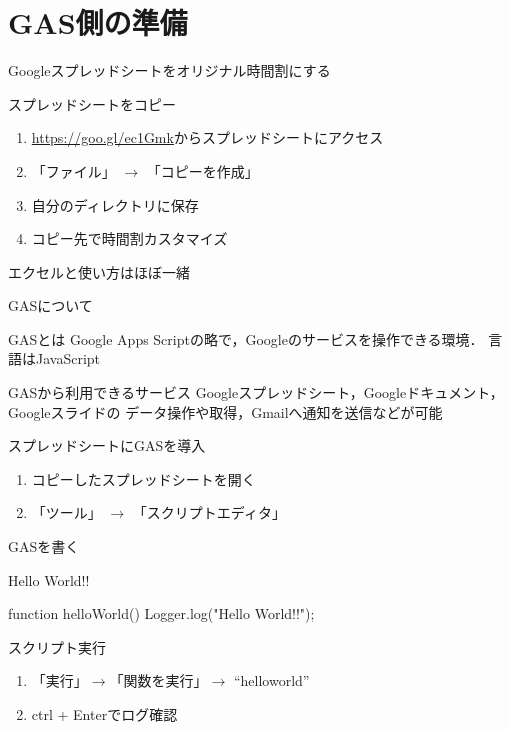 \documentclass[dvipdfmx,xcolor={svgnames}]{beamer}
\begin{document}
  \section{GAS側の準備}
  \begin{frame}{Googleスプレッドシートをオリジナル時間割にする}
    \begin{block}{スプレッドシートをコピー}
      \begin{enumerate}\setlength{\itemsep}{15pt}
        \item \url{https://goo.gl/ec1Gmk}からスプレッドシートにアクセス
        \item 「ファイル」 $\rightarrow$ 「コピーを作成」
        \item 自分のディレクトリに保存
        \item コピー先で時間割カスタマイズ
      \end{enumerate}
    \end{block}
    {\huge エクセルと使い方はほぼ一緒}
    \end{frame}
  \begin{frame}{GASについて}
    \begin{block}{GASとは}
      Google Apps Scriptの略で，Googleのサービスを操作できる環境．
      言語はJavaScript
    \end{block}
    \begin{block}{GASから利用できるサービス}
      Googleスプレッドシート，Googleドキュメント，Googleスライドの
      データ操作や取得，Gmailへ通知を送信などが可能
    \end{block}
  \end{frame}
  \begin{frame}{スプレッドシートにGASを導入}
    \begin{enumerate}  \setlength{\itemsep}{20pt}\LARGE
      \item コピーしたスプレッドシートを開く
      \item 「ツール」 $\rightarrow$ 「スクリプトエディタ」
    \end{enumerate}
  \end{frame}

  \begin{frame}[fragile]{GASを書く}
    \begin{exampleblock}{Hello World!!}
      \begin{GAS}
function helloWorld(){
  Logger.log("Hello World!!");
}
      \end{GAS}
    \end{exampleblock}
    \begin{block}{スクリプト実行}
      \begin{enumerate}
        \item 「実行」$\rightarrow$「関数を実行」$\rightarrow$ ``helloworld''
        \item ctrl + Enterでログ確認
      \end{enumerate}
    \end{block}
  \end{frame}
\end{document}
